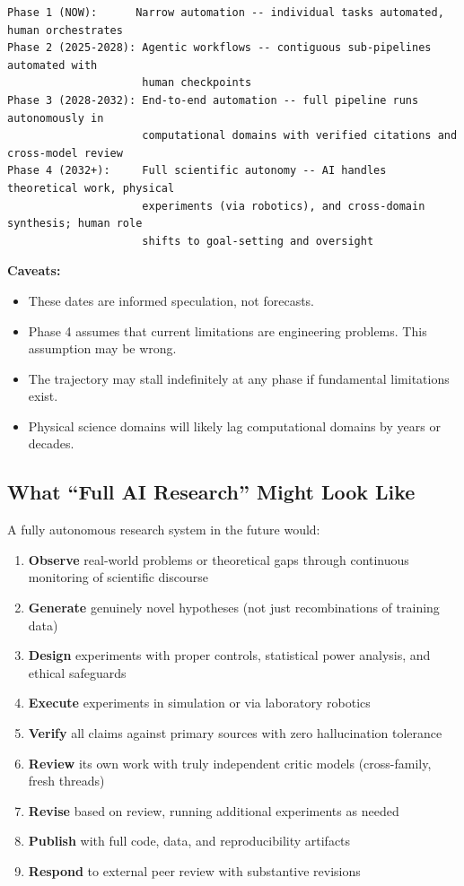 \documentclass[11pt,a4paper]{article}
\begin{document}
\begin{verbatim}
Phase 1 (NOW):      Narrow automation -- individual tasks automated, human orchestrates
Phase 2 (2025-2028): Agentic workflows -- contiguous sub-pipelines automated with
                     human checkpoints
Phase 3 (2028-2032): End-to-end automation -- full pipeline runs autonomously in
                     computational domains with verified citations and cross-model review
Phase 4 (2032+):     Full scientific autonomy -- AI handles theoretical work, physical
                     experiments (via robotics), and cross-domain synthesis; human role
                     shifts to goal-setting and oversight
\end{verbatim}

\textbf{Caveats:}
\begin{itemize}[leftmargin=2em]
    \item These dates are informed speculation, not forecasts.
    \item Phase 4 assumes that current limitations are engineering problems. This assumption may be wrong.
    \item The trajectory may stall indefinitely at any phase if fundamental limitations exist.
    \item Physical science domains will likely lag computational domains by years or decades.
\end{itemize}

\subsection{What ``Full AI Research'' Might Look Like}

A fully autonomous research system in the future would:
\begin{enumerate}[leftmargin=2em]
    \item \textbf{Observe} real-world problems or theoretical gaps through continuous monitoring of scientific discourse
    \item \textbf{Generate} genuinely novel hypotheses (not just recombinations of training data)
    \item \textbf{Design} experiments with proper controls, statistical power analysis, and ethical safeguards
    \item \textbf{Execute} experiments in simulation or via laboratory robotics
    \item \textbf{Verify} all claims against primary sources with zero hallucination tolerance
    \item \textbf{Review} its own work with truly independent critic models (cross-family, fresh threads)
    \item \textbf{Revise} based on review, running additional experiments as needed
    \item \textbf{Publish} with full code, data, and reproducibility artifacts
    \item \textbf{Respond} to external peer review with substantive revisions
\end{enumerate}
\end{document}
